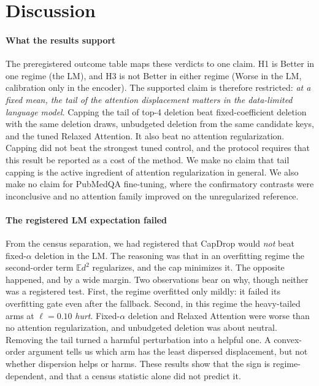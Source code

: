\section{Discussion}\label{sec:discussion}

\paragraph{What the results support}
The preregistered outcome table maps these verdicts to one claim. H1 is Better in one regime (the LM), and H3 is not Better in either
regime (Worse in the LM, calibration only in the encoder). The supported claim is therefore restricted:
\emph{at a fixed mean, the tail of the attention displacement matters in the data-limited language model}. Capping
the tail of top-4 deletion beat fixed-coefficient deletion with the same deletion draws, unbudgeted deletion
from the same candidate keys, and the tuned Relaxed Attention. It also beat no attention regularization. Capping did
not beat the strongest tuned control, and the protocol requires that this result be reported as a cost of the method. We make no claim that tail
capping is the active ingredient of attention regularization in general. We also make no claim for PubMedQA fine-tuning,
where the confirmatory contrasts were inconclusive and no attention family improved on the unregularized reference.

\paragraph{The registered LM expectation failed}
From the census separation, we had registered that CapDrop would \emph{not} beat fixed-$\alpha$ deletion in the LM.
The reasoning was that in an overfitting regime the second-order term $\mathbb E d^2$ regularizes, and the cap minimizes it.
The opposite happened, and by a wide margin. Two observations bear on why, though neither was a registered test. First, the regime overfitted
only mildly: it failed its overfitting gate even after the fallback. Second, in this regime the heavy-tailed arms at
$\ell=0.10$ \emph{hurt}. Fixed-$\alpha$ deletion and Relaxed Attention were worse than no attention regularization, and
unbudgeted deletion was about neutral. Removing the tail turned a harmful perturbation into a helpful one. A
convex-order argument tells us which arm has the least dispersed displacement, but not whether dispersion helps or harms.
These results show that the sign is regime-dependent, and that a census statistic alone did not predict it.

